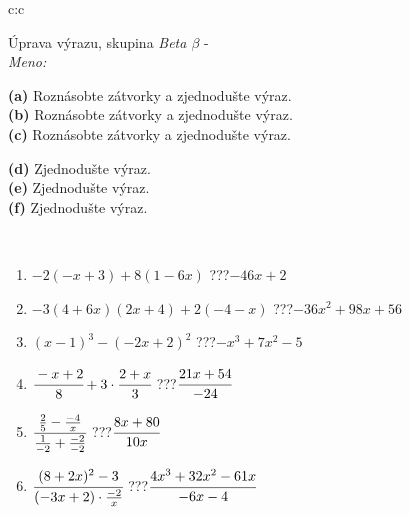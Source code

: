 \documentclass[10pt]{report}
\begin{document}
\newpage
\thispagestyle{empty}
\begin{tabular}{c:c}
\begin{minipage}[c][104.5mm][t]{0.5\linewidth}
\begin{center}
\vspace{7mm}
{\huge Úprava výrazu, skupina \textit{Beta $\beta$} -}\\[5mm]
\textit{Meno:}\phantom{xxxxxxxxxxxxxxxxxxxxxxxxxxxxxxxxxxxxxxxxxxxxxxxxxxxxxxxxxxxxxxxxx}\\[5mm]
\begin{minipage}{0.95\linewidth}
\begin{center}
{\small \begin{minipage}{0.6\textwidth}
\textbf{(a)} Roznásobte zátvorky a zjednodušte výraz. \\[1mm]
\textbf{(b)} Roznásobte zátvorky a zjednodušte výraz. \\[1mm]
\textbf{(c)} Roznásobte zátvorky a zjednodušte výraz.
\end{minipage} \begin{minipage}{0.39\textwidth}
\textbf{(d)} Zjednodušte výraz. \\[1mm]
\textbf{(e)} Zjednodušte výraz. \\[1mm]
\textbf{(f)} Zjednodušte výraz.
\end{minipage}
}
\end{center}
\end{minipage}
\\[4mm]
\begin{minipage}{0.79\linewidth}
\begin{center}
\begin{varwidth}{\linewidth}
\begin{enumerate}
\normalsize
\item $-2(-x+3)+8(1-6x)$\quad \dotfill\; ???\;\dotfill \quad $-46x+2$
\item $-3(4+6x)(2x+4)+2(-4-x)$\quad \dotfill\; ???\;\dotfill \quad $-36x^2+98x+56$
\item $(x-1)^3-(-2x+2)^2$\quad \dotfill\; ???\;\dotfill \quad $-x^3+7x^2-5$
\item $\cfrac{-x+2}{8}+3\cdot\cfrac{2+x}{3}$\quad \dotfill\; ???\;\dotfill \quad $\cfrac{21x+54}{-24}$
\item $\cfrac{\frac{2}{5}-\frac{-4}{x}}{\frac{1}{-2}+\frac{-2}{-2}}$\quad \dotfill\; ???\;\dotfill \quad $\cfrac{8x+80}{10x}$
\item $\cfrac{(8+2x)^2-3}{(-3x+2)\cdot\frac{-2}{x}}$\quad \dotfill\; ???\;\dotfill \quad $\cfrac{4x^3+32x^2-61x}{-6x-4}$

\end{enumerate}
\end{varwidth}
\end{center}
\end{minipage}
\end{center}
\end{minipage}
\end{tabular}
\end{document}
